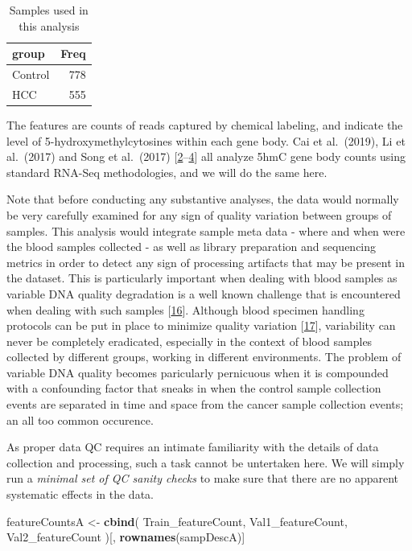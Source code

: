 \documentclass[
]{book}
\newenvironment{Shaded}{\begin{snugshade}}{\end{snugshade}}
\newcommand{\KeywordTok}[1]{\textcolor[rgb]{0.13,0.29,0.53}{\textbf{#1}}}
\newcommand{\NormalTok}[1]{#1}
\newcommand{\StringTok}[1]{\textcolor[rgb]{0.31,0.60,0.02}{#1}}
\begin{document}
\begin{table}

\caption{\label{tab:subsetSamples}Samples used in this analysis}
\centering
\begin{tabular}[t]{l|r}
\hline
group & Freq\\
\hline
Control & 778\\
\hline
HCC & 555\\
\hline
\end{tabular}
\end{table}

The features are counts of reads captured by chemical labeling, and indicate
the level of 5-hydroxymethylcytosines within each gene body. Cai et al.~(2019),
Li et al.~(2017) and Song et al.~(2017) {[}\protect\hyperlink{ref-Cai:2019aa}{2}--\protect\hyperlink{ref-Song:2017aa}{4}{]}
all analyze 5hmC gene body counts using standard RNA-Seq methodologies, and we will
do the same here.

Note that before conducting any substantive analyses, the data would normally
be very carefully examined for any sign of quality variation between groups
of samples. This analysis would integrate sample meta data - where and when were
the blood samples collected - as well as library preparation and sequencing metrics
in order to detect any sign of processing artifacts that may be present in the dataset.
This is particularly important when dealing with blood samples as variable
DNA quality degradation is a well known challenge that is encountered when dealing with
such samples {[}\protect\hyperlink{ref-Huang:2017aa}{16}{]}. Although blood specimen handling protocols can be
put in place to minimize quality variation {[}\protect\hyperlink{ref-Permenter:2015aa}{17}{]}, variability
can never be completely eradicated, especially in the context of blood samples
collected by different groups, working in different environments. The problem
of variable DNA quality becomes paricularly pernicuous when it is compounded
with a confounding factor that sneaks in when the control sample collection
events are separated in time and space from the cancer sample collection events;
an all too common occurence.

As proper data QC requires an intimate familiarity with the details of
data collection and processing, such a task cannot be untertaken here.
We will simply run a \emph{minimal set of QC sanity checks} to make sure that
there are no apparent systematic effects in the data.

\begin{Shaded}
\begin{Highlighting}[]
\NormalTok{featureCountsA <{-}}\StringTok{ }\KeywordTok{cbind}\NormalTok{(}
\NormalTok{  Train\_featureCount,}
\NormalTok{  Val1\_featureCount,}
\NormalTok{  Val2\_featureCount}
\NormalTok{)[, }\KeywordTok{rownames}\NormalTok{(sampDescA)]}
\end{Highlighting}
\end{Shaded}
\end{document}
